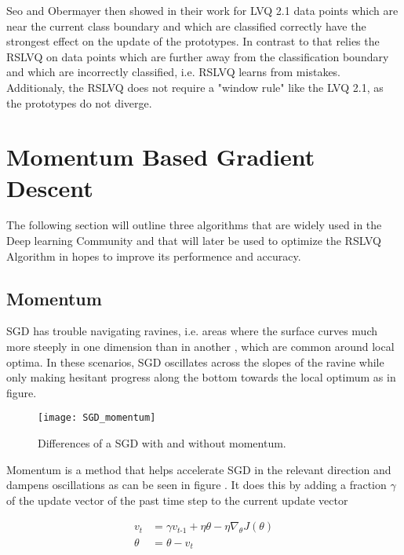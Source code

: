 \documentclass[12pt,oneside,a4paper,parskip]{scrbook}
\begin{document}
Seo and Obermayer then showed in their work \cite{RSLVQOrig} for LVQ 2.1 data points which are near the current 
class boundary and which are classified correctly have the strongest effect on the update of the prototypes. In contrast to that
relies the RSLVQ on data points which are further away from the classification boundary and which are incorrectly classified,
i.e. RSLVQ learns from mistakes. Additionaly, the RSLVQ does not require a "window rule" like the LVQ 2.1, as the prototypes 
do not diverge. \cite{RSLVQOrig}

\section{Momentum Based Gradient Descent}

The following section will outline three algorithms that are widely used in the Deep learning Community and that will later
be used to optimize the RSLVQ Algorithm in hopes to improve its performence and accuracy.

\subsection{Momentum}

SGD has trouble navigating ravines, i.e. areas where the surface curves much more steeply in one dimension than in another \cite{problemSteepLearn, overvieDiffRSLVQ},
which are common around local optima. In these scenarios, SGD oscillates across the slopes of the ravine while only making 
hesitant progress along the bottom towards the local optimum as in figure.

\begin{figure}[H]
  \centering
  \texttt{[image: SGD\_momentum]}
  \caption[Diff. SGD moment.]{Differences of a SGD with and without momentum.\footnotemark} 
  \label{fig:SGD_momentum}
\end{figure}

Momentum \cite{QIAN1999145, overvieDiffRSLVQ} is a method that helps accelerate SGD in the relevant direction and dampens
oscillations as can be seen in figure . It does this by adding a fraction $\gamma $ of the update vector of the past time step to the
current update vector

\begin{equation}
\begin{split}
\textit{v}_\textit{t} &= \gamma\textit{v}_\textit{t-1} + \eta \theta - \eta\nabla_\theta \textit{J}(\theta) \\
\theta &= \theta - \textit{v}_\textit{t}
\end{split}
\end{equation}
\end{document}
